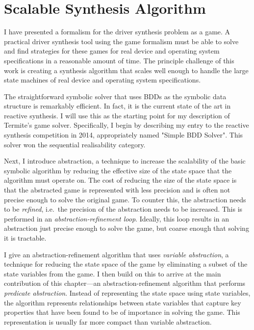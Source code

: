 \chapter{Scalable Synthesis Algorithm}
\label{ch:solving}

I have presented a formalism for the driver synthesis problem as a game. A practical driver synthesis tool using the game formalism must be able to solve and find strategies for these games for real device and operating system specifications in a reasonable amount of time. The principle challenge of this work is creating a synthesis algorithm that scales well enough to handle the large state machines of real device and operating system specifications. 

The straightforward symbolic solver that uses BDDs as the symbolic data structure is remarkably efficient. In fact, it is the current state of the art in reactive synthesis. I will use this as the starting point for my description of Termite's game solver.  Specifically, I begin by describing my entry to the reactive synthesis competition in 2014, appropriately named "Simple BDD Solver". This solver won the sequential realisability category.

Next, I introduce abstraction, a technique to increase the scalability of the basic symbolic algorithm by reducing the effective size of the state space that the algorithm must operate on. The cost of reducing the size of the state space is that the abstracted game is represented with less precision and is often not precise enough to solve the original game. To counter this, the abstraction needs to be \emph{refined}, i.e.\ the precision of the abstraction needs to be increased. This is performed in an \emph{abstraction-refinement loop}. Ideally, this loop results in an abstraction just precise enough to solve the game, but coarse enough that solving it is tractable.

I give an abstraction-refinement algorithm that uses \emph{variable abstraction}, a technique for reducing the state space of the game by eliminating a subset of the state variables from the game. I then build on this to arrive at the main contribution of this chapter---an abstraction-refinement algorithm that performs \emph{predicate abstraction}.  Instead of representing the state space using state variables, the algorithm represents relationships between state variables that capture key properties that have been found to be of importance in solving the game. This representation is usually far more compact than variable abstraction. 

